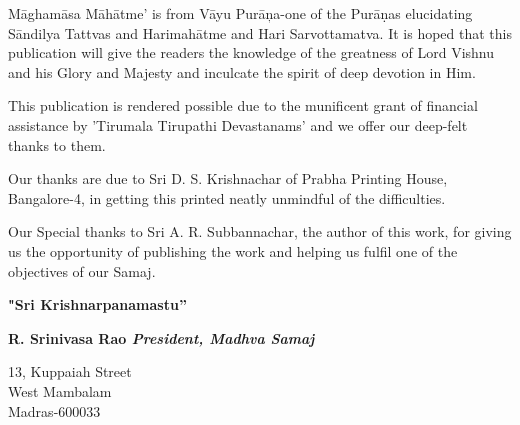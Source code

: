 Māghamāsa Māhātme' is from Vāyu Purāņa-one of the Purāṇas elucidating Sāndilya Tattvas and Harimahātme and Hari Sarvottamatva. It is hoped that this publication will give the readers the knowledge of the greatness of Lord Vishnu and his Glory and Majesty and inculcate the spirit of deep devotion in Him.

This publication is rendered possible due to the munificent grant of financial assistance by 'Tirumala Tirupathi Devastanams' and we offer our deep-felt thanks to them.

Our thanks are due to Sri D. S. Krishnachar of Prabha Printing House, Bangalore-4, in getting this printed neatly unmindful of the difficulties.

Our Special thanks to Sri A. R. Subbannachar, the author of this work, for giving us the opportunity of publishing the work and helping us fulfil one of the objectives of our Samaj.

\begin{center}
\textbf{"Sri Krishnarpanamastu”}
\end{center}

\begin{flushright}
\textbf{R. Srinivasa Rao \textit{President, Madhva Samaj}}
\end{flushright}

\begin{flushleft}
13, Kuppaiah Street \\ West Mambalam \\ Madras-600033
\end{flushleft}

